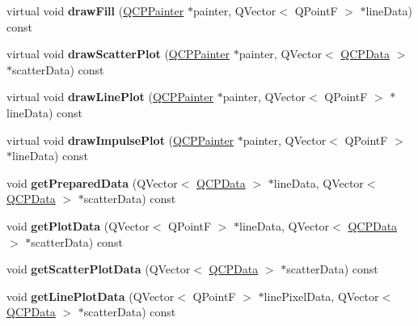 \begin{DoxyCompactItemize}
\mbox{\label{class_q_c_p_graph_a9e6ce6db9aa7b29fc397c724fcf7b126}} 
virtual void {\bfseries draw\+Fill} (\hyperlink{class_q_c_p_painter}{Q\+C\+P\+Painter} $\ast$painter, Q\+Vector$<$ Q\+PointF $>$ $\ast$line\+Data) const
\item 
\mbox{\label{class_q_c_p_graph_ae1f3edd5eb41aa5782e61673488fd3e0}} 
virtual void {\bfseries draw\+Scatter\+Plot} (\hyperlink{class_q_c_p_painter}{Q\+C\+P\+Painter} $\ast$painter, Q\+Vector$<$ \hyperlink{class_q_c_p_data}{Q\+C\+P\+Data} $>$ $\ast$scatter\+Data) const
\item 
\mbox{\label{class_q_c_p_graph_af460db06d4d6466806721fe101f512e3}} 
virtual void {\bfseries draw\+Line\+Plot} (\hyperlink{class_q_c_p_painter}{Q\+C\+P\+Painter} $\ast$painter, Q\+Vector$<$ Q\+PointF $>$ $\ast$line\+Data) const
\item 
\mbox{\label{class_q_c_p_graph_ac62c84f51d85b78ee583455b8c37ba56}} 
virtual void {\bfseries draw\+Impulse\+Plot} (\hyperlink{class_q_c_p_painter}{Q\+C\+P\+Painter} $\ast$painter, Q\+Vector$<$ Q\+PointF $>$ $\ast$line\+Data) const
\item 
\mbox{\label{class_q_c_p_graph_ae853c297da9d21b6720d2d1c3b0121bf}} 
void {\bfseries get\+Prepared\+Data} (Q\+Vector$<$ \hyperlink{class_q_c_p_data}{Q\+C\+P\+Data} $>$ $\ast$line\+Data, Q\+Vector$<$ \hyperlink{class_q_c_p_data}{Q\+C\+P\+Data} $>$ $\ast$scatter\+Data) const
\item 
\mbox{\label{class_q_c_p_graph_a5ec495f97b8185ba9712430cb1558f52}} 
void {\bfseries get\+Plot\+Data} (Q\+Vector$<$ Q\+PointF $>$ $\ast$line\+Data, Q\+Vector$<$ \hyperlink{class_q_c_p_data}{Q\+C\+P\+Data} $>$ $\ast$scatter\+Data) const
\item 
\mbox{\label{class_q_c_p_graph_a6ea929da420e6c104998060d19740ed6}} 
void {\bfseries get\+Scatter\+Plot\+Data} (Q\+Vector$<$ \hyperlink{class_q_c_p_data}{Q\+C\+P\+Data} $>$ $\ast$scatter\+Data) const
\item 
\mbox{\label{class_q_c_p_graph_a77314984a7af578a66e939db0db48556}} 
void {\bfseries get\+Line\+Plot\+Data} (Q\+Vector$<$ Q\+PointF $>$ $\ast$line\+Pixel\+Data, Q\+Vector$<$ \hyperlink{class_q_c_p_data}{Q\+C\+P\+Data} $>$ $\ast$scatter\+Data) const

\end{DoxyCompactItemize}
